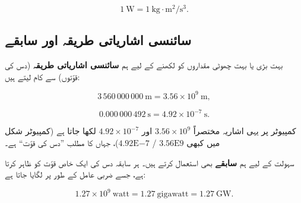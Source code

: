 \documentclass{urdu-textbook}
\begin{document}
\[1\ \mathrm{W} = 1\ \mathrm{kg\cdot m^{2}/s^{3}}.\]

\hypertarget{ux633ux627ux626ux646ux633ux6cc-ux627ux634ux627ux631ux6ccux627ux62aux6cc-ux637ux631ux6ccux642ux6c1-ux627ux648ux631-ux633ux627ux628ux642ux6d2}{%
\subsection{سائنسی اشاریاتی طریقہ اور
سابقے}\label{ux633ux627ux626ux646ux633ux6cc-ux627ux634ux627ux631ux6ccux627ux62aux6cc-ux637ux631ux6ccux642ux6c1-ux627ux648ux631-ux633ux627ux628ux642ux6d2}}

بہت بڑی یا بہت چھوٹی مقداروں کو لکھنے کے لیے ہم \textbf{سائنسی اشاریاتی
طریقہ} (دس کی قوّتوں) سے کام لیتے ہیں:

\[3\,560\,000\,000\ \mathrm{m} = 3.56\times10^{9}\ \mathrm{m},\]

\[0.000\,000\,492\ \mathrm{s} = 4.92\times10^{-7}\ \mathrm{s}.\]

کمپیوٹر پر یہی اشاریہ مختصراً \(3.56\times10^{9}\) اور
\(4.92\times10^{-7}\) لکھا جاتا ہے (کمپیوٹر شکل میں کبھی
\(3.56\mathrm{E}9\) / \(4.92\mathrm{E}{-7}\))، جہاں  کا مطلب ''دس کی
قوّت`` ہے۔

سہولت کے لیے ہم \textbf{سابقے}  بھی استعمال کرتے ہیں۔ ہر سابقہ
دس کی ایک خاص قوّت کو ظاہر کرتا ہے، جسے ضربی عامل کے طور پر لگایا جاتا
ہے:

\[1.27\times10^{9}\ \mathrm{watt} = 1.27\ \mathrm{gigawatt} = 1.27\ \mathrm{GW}.\]
\end{document}
